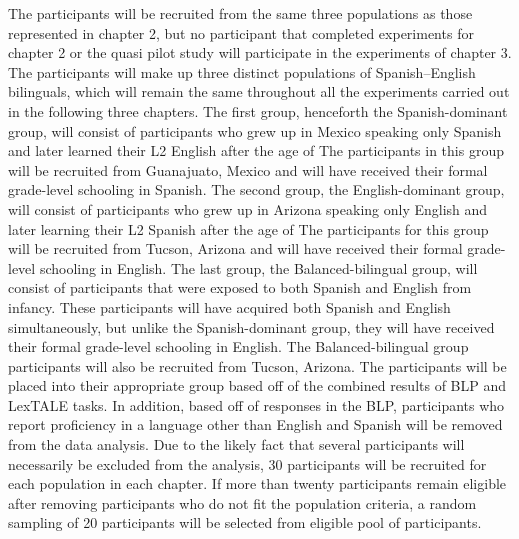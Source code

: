\documentclass[
12pt, %
english, %
doublespacing, %
nolistspacing, %
liststotoc, %
headsepline, %
chapterinoneline, %
openany, %
]{DoctoralThesis}\usepackage[]{graphicx}\usepackage[]{color}
\begin{document}
The participants will be recruited from the same three populations as those represented in chapter 2, but no participant that completed experiments for chapter 2 or the quasi pilot study will participate in the experiments of chapter 3. The participants will make up three distinct populations of Spanish–English bilinguals, which will remain the same throughout all the experiments carried out in the following three chapters. The first group, henceforth the Spanish-dominant group, will consist of participants who grew up in Mexico speaking only Spanish and later learned their L2 English after the age of %
The participants in this group will be recruited from Guanajuato, Mexico and will have received their formal grade-level schooling in Spanish. The second group, the English-dominant group, will consist of participants who grew up in Arizona speaking only English and later learning their L2 Spanish after the age of %
The participants for this group will be recruited from Tucson, Arizona and will have received their formal grade-level schooling in English. The last group, the Balanced-bilingual group, will consist of participants that were exposed to both Spanish and English from infancy. These participants will have acquired both Spanish and English simultaneously, but unlike the Spanish-dominant group, they will have received their formal grade-level schooling in English. The Balanced-bilingual group participants will also be recruited from Tucson, Arizona. The participants will be placed into their appropriate group based off of the combined results of BLP and LexTALE tasks. In addition, based off of responses in the BLP, participants who report proficiency in a language other than English and Spanish will be removed from the data analysis. Due to the likely fact that several participants will necessarily be excluded from the analysis, 30 participants will be recruited for each population in each chapter. If more than twenty participants remain eligible after removing participants who do not fit the population criteria, a random sampling of 20 participants will be selected from eligible pool of participants.
\end{document}

